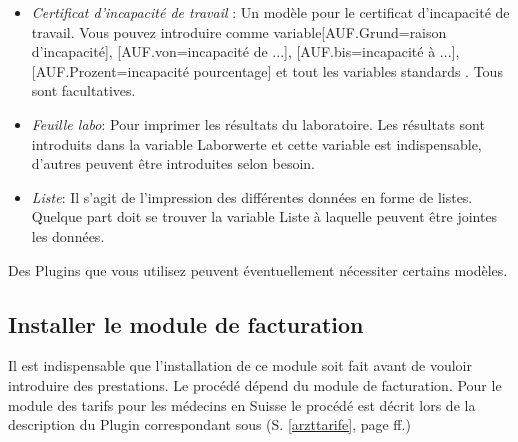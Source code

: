 \begin{itemize}
 \item \textit{Certificat d'incapacité de travail }: Un modèle pour le certificat d'incapacité de travail.  Vous pouvez introduire comme variable[AUF.Grund=raison d'incapacité], [AUF.von=incapacité de ...], [AUF.bis=incapacité à ...], [AUF.Prozent=incapacité pourcentage] et tout les variables standards . Tous sont facultatives.


 \item \textit{Feuille labo}: Pour imprimer les résultats du laboratoire. Les résultats sont introduits dans la variable  Laborwerte  et cette variable est indispensable, d'autres peuvent être introduites selon besoin. 
 \item \textit{Liste}: Il s'agit de l'impression des différentes données en forme de listes. Quelque part doit se trouver la variable  Liste  à laquelle peuvent être jointes les données.


\end{itemize}

Des Plugins que vous utilisez peuvent éventuellement nécessiter certains modèles.

\subsection{Installer le module de facturation}
\label{conf:abrechnung}
Il est indispensable que l'installation de ce module soit fait avant de vouloir introduire des prestations. Le procédé dépend du module de facturation. Pour le module des tarifs pour les médecins en Suisse le procédé est décrit lors de la description du Plugin correspondant sous (S. \ref{arzttarife}, page \pageref{arzttarife} ff.)

